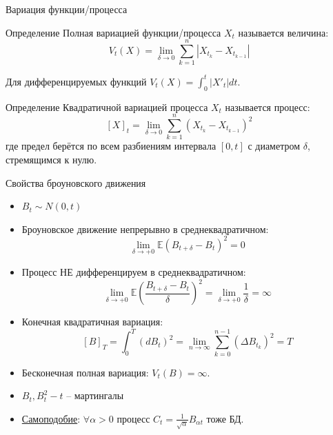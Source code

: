 \documentclass{beamer}
\begin{document}
\begin{frame}{Вариация функции/процесса}
    \begin{block}{Определение}
        Полная вариацией функции/процесса $X_t$ называется величина:
        $$
            V_t(X) = \lim_{\delta \to 0} \sum_{k=1}^n |X_{t_k} - X_{t_{k-1}}|
        $$
    \end{block} Для дифференцируемых функций $V_t(X)=\int_0^t |X'_t|dt$. 
    \begin{block}{Определение}
        Квадратичной вариацией процесса $X_t$ называется процесс:
        $$
            [X]_t = \lim_{\delta \to 0} \sum_{k=1}^n (X_{t_k} - X_{t_{k-1}})^2
        $$где предел берётся по всем разбиениям интервала $[0, t]$ с диаметром $\delta$, стремящимся к нулю.
    \end{block}
\end{frame}

\begin{frame}{Свойства броуновского движения}
    \begin{itemize}
        \item $B_t \sim N(0, t)$
         
        \item Броуновское движение непрерывно в среднеквадратичном:
        $$
            \lim_{\delta \to +0}\mathbb{E} \left( B_{t+\delta} - B_t \right)^2 = 0
        $$
         
        \item Процесс НЕ дифференцируем в среднеквадратичном:
        $$
            \lim_{\delta \to +0}\mathbb{E} \left(\dfrac{ B_{t+\delta} - B_t }{\delta}\right)^2 = \lim_{\delta \to +0} \dfrac{1}{\delta}  = \infty
        $$
         
        \item Конечная квадратичная вариация:
        $$
            \left[ B \right]_T = \int_0^T (dB_t)^2 = \lim_{n\to \infty} \sum_{k=0}^{n-1} \left(\Delta B_{t_k}\right)^2 = T
        $$
        \item Бесконечная полная вариация: $V_t(B) = \infty$.
        \item $B_t, B_t^2-t$ -- мартингалы
        \item \href{https://ru.wikipedia.org/wiki/Винеровский_процесс#/media/Файл:Wiener_process_animated.gif}{Самоподобие}: $\forall \alpha > 0$  процесс $C_t = \frac{1}{\sqrt{\alpha}} B_{\alpha t}$ тоже БД.
    \end{itemize}
\end{frame}
\end{document}
